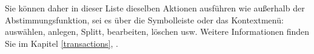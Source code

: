 Sie können daher in dieser Liste dieselben Aktionen ausführen wie außerhalb der Abstimmungsfunktion, sei es über die Symbolleiste oder das Kontextmenü: auswählen, anlegen, Splitt, bearbeiten, löschen usw. Weitere Informationen finden Sie im Kapitel \vref{transactions}, .


